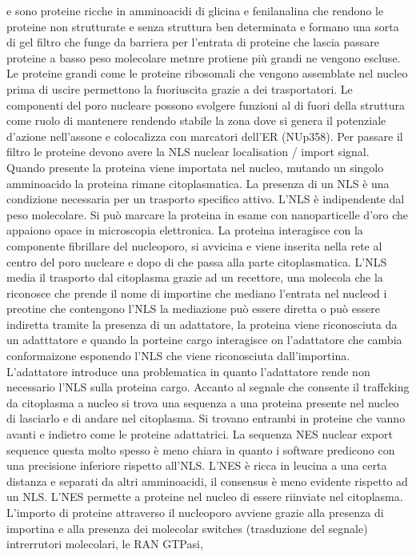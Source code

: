 e sono proteine ricche in amminoacidi di glicina e fenilanalina che rendono le proteine non strutturate e senza struttura ben determinata e formano una sorta di gel filtro che funge 
da barriera per l'entrata di proteine che lascia passare proteine a basso peso molecolare metnre protiene pi\`u grandi ne vengono escluse. Le proteine grandi come le proteine ribosomali
che vengono assemblate nel nucleo prima di uscire permettono la fuoriuscita grazie a dei trasportatori. Le componenti del poro nucleare possono svolgere funzioni al di fuori della
struttura come ruolo di mantenere rendendo stabile la zona dove si genera il potenziale d'azione nell'assone e colocalizza con marcatori dell'ER (NUp358). Per passare il filtro le
proteine devono avere la NLS nuclear localisation / import signal. Quando presente la proteina viene importata nel nucleo, mutando un singolo amminoacido la proteina rimane 
citoplasmatica. La presenza di un NLS \`e una condizione necessaria per un trasporto specifico attivo. L'NLS \`e indipendente dal peso molecolare. Si pu\`o marcare la proteina in esame
con nanoparticelle d'oro che appaiono opace in microscopia elettronica. La proteina interagisce con la componente fibrillare del nucleoporo, si avvicina e viene inserita nella rete 
al centro del poro nucleare e dopo di che passa alla parte citoplasmatica. L'NLS media il trasporto dal citoplasma grazie ad un recettore, una molecola che la riconosce che prende il 
nome di importine che mediano l'entrata nel nucleod i preotine che contengono l'NLS la mediazione pu\`o essere diretta o pu\`o essere indiretta tramite la presenza di un adattatore, la
proteina viene riconosciuta da un adatttatore e quando la porteine cargo interagisce on l'adattatore che cambia conformaizone esponendo l'NLS che viene riconosciuta dall'importina. 
L'adattatore introduce una problematica in quanto l'adattatore rende non necessario l'NLS sulla proteina cargo. Accanto al segnale che consente il traffcking da citoplasma a nucleo 
si trova una sequenza a una proteina presente nel nucleo di lasciarlo e di andare nel citoplasma. Si trovano entrambi in proteine che vanno avanti e indietro come le proteine adattatrici.
La sequenza NES nuclear export sequence questa molto spesso \`e meno chiara in quanto i software predicono con una precisione inferiore rispetto all'NLS. L'NES \`e ricca in leucina a
una certa distanza e separati da altri amminoacidi, il consensus \`e meno evidente rispetto ad un NLS. L'NES permette a proteine nel nucleo di essere riinviate nel citoplasma. L'importo
di proteine attraverso il nucleoporo avviene grazie alla presenza di importina e alla presenza dei molecolar switches (trasduzione del segnale) intrerrutori molecolari, le RAN GTPasi, 
